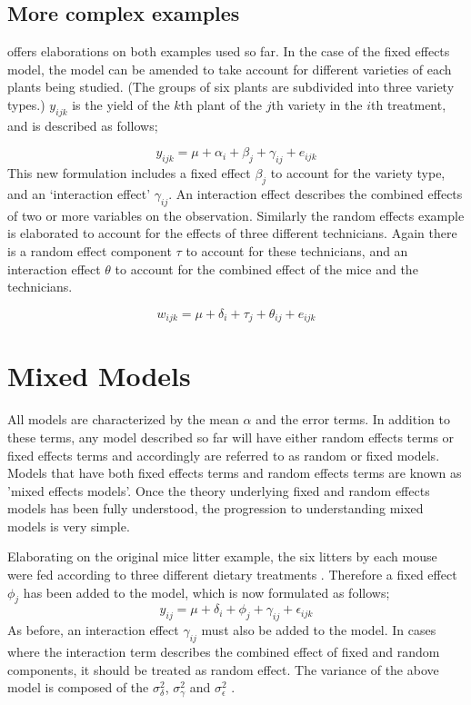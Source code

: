 \documentclass[12pt, a4paper]{report}
\begin{document}
\subsection{More complex examples}
\citet{Searle} offers elaborations on both examples used so far.
In the case of the fixed effects model, the model can be amended
to take account for different varieties of each plants being
studied. (The groups of six plants are subdivided into three
variety types.) $y_{ijk}$ is the yield of the $k$th plant of the
$j$th variety in the $i$th treatment, and is described as follows;

\begin{equation}
y_{ijk} = \mu + \alpha_{i} + \beta_{j} + \gamma_{ij} + e_{ijk}
\end{equation}
This new formulation includes a fixed effect $\beta_{j}$ to
account for the variety type, and an `interaction effect'
$\gamma_{ij}$. An interaction effect describes the combined
effects of two or more variables on the observation. Similarly the
random effects example is elaborated to account for the effects of
three different technicians. Again there is a random effect
component $\tau$ to account for these technicians, and an
interaction effect $\theta$ to account for the combined effect of
the mice and the technicians.

\begin{equation}
w_{ijk} = \mu + \delta_{i} + \tau_{j} + \theta_{ij} + e_{ijk}
\end{equation}

\section{Mixed Models}


All models are characterized by the mean $\alpha$ and the error
terms. In addition to these terms, any model described so far will
have either random effects terms or fixed effects terms and
accordingly are referred to as random or fixed models. Models that
have both fixed effects terms and random effects terms are known
as 'mixed effects models'. Once the theory underlying fixed and
random effects models has been fully understood, the progression
to understanding mixed models is very simple.

Elaborating on the original mice litter example, the six litters
by each mouse were fed according to three different dietary
treatments \citep{Searle}. Therefore a fixed effect $\phi_{j}$ has
been added to the model, which is now formulated as follows;
\begin{equation}
y_{ij} = \mu + \delta_{i} + \phi_{j} + \gamma_{ij} +
\epsilon_{ijk}
\end{equation}
As before, an interaction effect $\gamma_{ij}$ must also be added
to the model. In cases where the interaction term describes the
combined effect of fixed and random components, it should be
treated as random effect. The variance of the above model is
composed of the $\sigma^{2}_{\delta}$, $\sigma^{2}_{\gamma}$ and
$\sigma^{2}_{\epsilon}$ .
\end{document}
